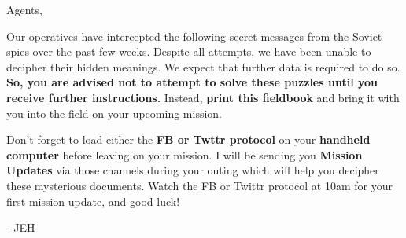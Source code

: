 \documentclass{puzzlehunt}
\begin{document}

\noindent Agents,

Our operatives have intercepted the following secret messages from the
Soviet spies over the past few weeks. Despite all attempts, we have been
unable to decipher their hidden meanings. We expect that further data
is required to do so.
\textbf{So, you are advised not to attempt to solve these puzzles until you
receive further instructions.} Instead, \textbf{print this fieldbook} and
bring it with you into the field on your upcoming mission.

Don't forget to load either the \textbf{FB or Twttr protocol} on your
\textbf{handheld computer} before leaving on your mission. I will be sending
you \textbf{Mission Updates} via those channels during your outing which
will help you decipher these mysterious documents. Watch the FB or Twittr
protocol at 10am for your first mission update, and good luck!

- JEH







\end{document}
